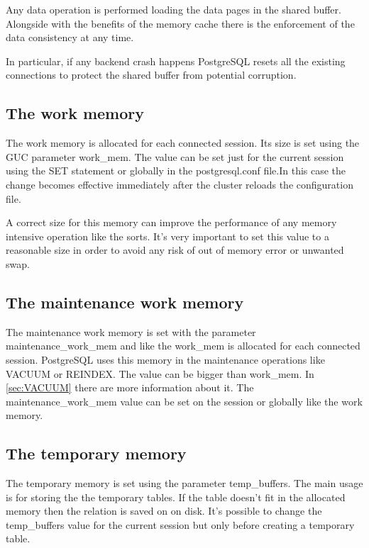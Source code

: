 Any data operation is performed loading the data pages in the shared buffer. Alongside with the
benefits of the memory cache there is the enforcement of the data consistency at any time.\newline

In particular, if any backend crash happens PostgreSQL resets all the existing connections to
protect the shared buffer from potential corruption. 



\subsection{The work memory}
\label{sub:WORKMEM}
The work memory is allocated for each connected session. Its size  is set using the GUC parameter
work\_mem. The value can be set just for the current session using the SET statement or globally in
the postgresql.conf file.In this case the change becomes effective immediately after the cluster
reloads the configuration file.\newline

A correct size for this memory can improve the performance of any memory intensive operation like
the sorts. It's very important to set this value to a reasonable size in order to avoid any risk of 
out of memory error or unwanted swap.\newline


\subsection{The maintenance work memory}
The maintenance work memory is set with the parameter maintenance\_work\_mem and like the work\_mem
is allocated for each connected session. PostgreSQL uses this memory in the maintenance operations 
like VACUUM or REINDEX. The value can be bigger than work\_mem. In \ref{sec:VACUUM}
there are more information about it. The maintenance\_work\_mem value can be set on the session or
globally like the work memory.

\subsection{The temporary memory}
\label{sub:TEMPBUF}
The temporary memory is set using the parameter temp\_buffers. The main usage is for storing the the
temporary tables. If the table doesn't fit in the allocated memory then the relation is saved
on on disk. It's possible to change the temp\_buffers value for the current session but only before
creating a temporary table.


